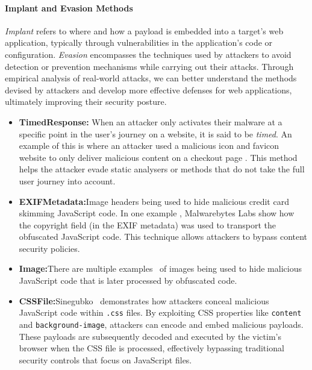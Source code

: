 \paragraph{Implant and Evasion Methods} \textit{Implant} refers to where and how a payload is embedded into a target's web application, typically through vulnerabilities in the application's code or configuration. \textit{Evasion} encompasses the techniques used by attackers to avoid detection or prevention mechanisms while carrying out their attacks. Through empirical analysis of real-world attacks, we can better understand the methods devised by attackers and develop more effective defenses for web applications, ultimately improving their security posture.

\begin{itemize}
\item \textbf{Timed\;Response:} When an attacker only activates their malware at a specific point in the user's journey on a website, it is said to be \textit{timed}. An example of this is where an attacker used a malicious icon and favicon website to only deliver malicious content on a checkout page \cite{segura_credit_2020}. This method helps the attacker evade static analysers or methods that do not take the full user journey into account.

\item \textbf{EXIF\;Metadata:}\;Image headers being used to hide malicious credit card skimming JavaScript code. In one example \cite{segura_web_2020}, Malwarebytes Labs show how the copyright field (in the EXIF metadata) was used to transport the obfuscated JavaScript code. This technique allows attackers to bypass content security policies.

\item \textbf{Image:}\;There are multiple examples~\cite{leal_skimmer_2020, segura_criminals_2020} of images being used to hide malicious JavaScript code that is later processed by obfuscated code.

\item \textbf{CSS\;File:}\;Sinegubko~\cite{sinegubko_css-js_2020} demonstrates how attackers conceal malicious JavaScript code within \texttt{.css} files. By exploiting CSS properties like \texttt{content} and \texttt{background-image}, attackers can encode and embed malicious payloads. These payloads are subsequently decoded and executed by the victim's browser when the CSS file is processed, effectively bypassing traditional security controls that focus on JavaScript files.


\end{itemize}
